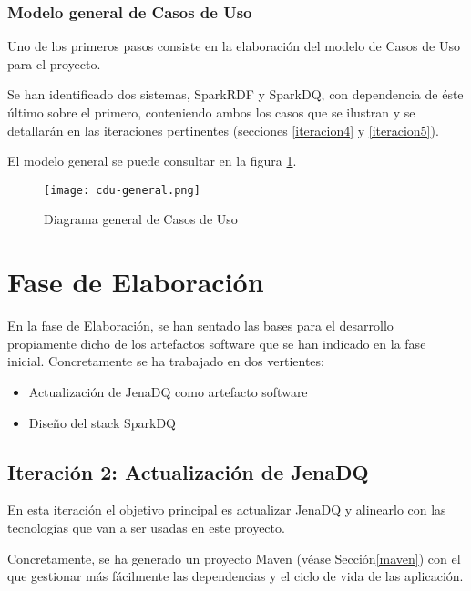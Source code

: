\subsubsection{Modelo general de Casos de Uso}

Uno de los primeros pasos consiste en la elaboración del modelo de Casos de Uso
para el proyecto. 

Se han identificado dos sistemas, SparkRDF y SparkDQ, con dependencia de éste
último sobre el primero, conteniendo ambos los casos que se ilustran y se
detallarán en las iteraciones pertinentes (secciones \ref{iteracion4} y \ref{iteracion5}). 

El modelo general se puede consultar en la figura \ref{fig:cdu-general}.

\begin{figure}[!h]
  \begin{center}
    \texttt{[image: cdu-general.png]} 
    \caption{Diagrama general de Casos de Uso}
    \label{fig:cdu-general}
  \end{center}
\end{figure}



\section{Fase de Elaboración}

En la fase de Elaboración, se han sentado las bases para el desarrollo
propiamente dicho de los artefactos software que se han indicado en la fase
inicial. Concretamente se ha trabajado en dos vertientes:

\begin{itemize}
\item Actualización de JenaDQ como artefacto software
\item Diseño del stack SparkDQ
\end{itemize}

\subsection{Iteración 2: Actualización de JenaDQ}



En esta iteración el objetivo principal es actualizar JenaDQ y alinearlo con las
tecnologías que van a ser usadas en este proyecto.

Concretamente, se ha generado
un proyecto Maven (véase Sección\ref{maven}) con el que gestionar más fácilmente
las dependencias y el ciclo de vida de las aplicación.

